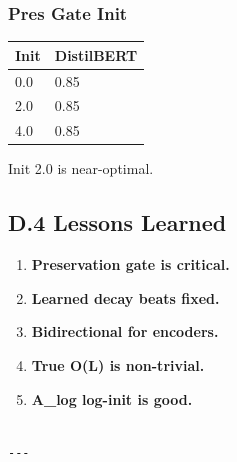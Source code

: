 \subsubsection{Pres Gate Init}

\begin{table}[H]
\centering
\small
\begin{tabular}{ll}
\toprule
\textbf{Init} & \textbf{DistilBERT} \\
\midrule
0.0 & 0.85 \\
2.0 & 0.85 \\
4.0 & 0.85 \\
\bottomrule
\end{tabular}
\end{table}

Init 2.0 is near-optimal.

\subsection{D.4 Lessons Learned}

\begin{enumerate}
\item \textbf{Preservation gate is critical.}
\item \textbf{Learned decay beats fixed.}
\item \textbf{Bidirectional for encoders.}
\item \textbf{True O(L) is non-trivial.}
\item \textbf{A\_log log-init is good.}
\end{enumerate}
\begin{lstlisting}

---
\end{lstlisting}
